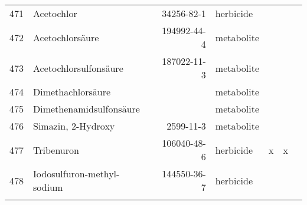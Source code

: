 \begin{longtable}{lp{3cm}rlp{0.5cm}p{0.5cm}p{1cm}}
  471 & Acetochlor & 34256-82-1 & herbicide &  &  &  \\ 
  472 & Acetochlorsäure & 194992-44-4 & metabolite &  &  &  \\ 
  473 & Acetochlorsulfonsäure & 187022-11-3 & metabolite &  &  &  \\ 
  474 & Dimethachlorsäure &  & metabolite &  &  &  \\ 
  475 & Dimethenamidsulfonsäure &  & metabolite &  &  &  \\ 
  476 & Simazin, 2-Hydroxy & 2599-11-3 & metabolite &  &  &  \\ 
  477 & Tribenuron & 106040-48-6 & herbicide & x & x &  \\ 
  478 & Iodosulfuron-methyl-sodium & 144550-36-7 & herbicide &  &  &  \\ 
  \label{tab:phch_var}
\end{longtable}
